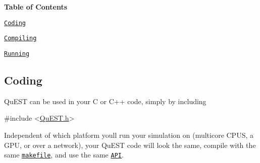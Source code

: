 {\bfseries Table of Contents}
\begin{DoxyItemize}
\item \href{#coding}{\tt Coding}
\item \href{#compiling}{\tt Compiling}
\item \href{#running}{\tt Running}
\end{DoxyItemize}

\subsection*{Coding}

Qu\+E\+ST can be used in your C or C++ code, simply by including 
\begin{DoxyCode}
\textcolor{preprocessor}{#include <\mbox{\hyperlink{QuEST_8h}{QuEST.h}}>}
\end{DoxyCode}


Independent of which platform you\textquotesingle{}ll run your simulation on (multicore C\+P\+US, a G\+PU, or over a network), your Qu\+E\+ST code will look the same, compile with the same \href{https://github.com/TysonRayJones/QuEST/blob/master/makefile}{\tt makefile}, and use the same \href{https://tysonrayjones.github.io/QuEST/QuEST_8h.html}{\tt A\+PI}.

